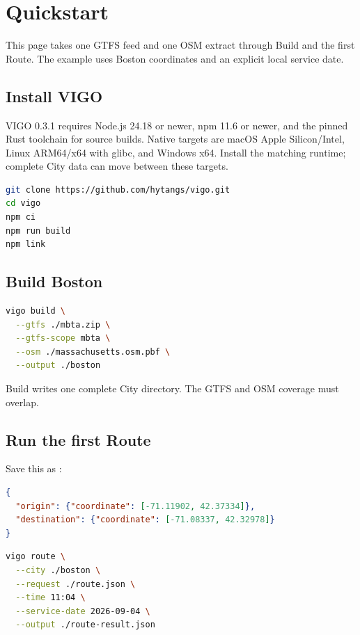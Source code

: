 \documentclass[10pt,letterpaper]{article}
\begin{document}
\guideheader

\section{Quickstart}

This page takes one GTFS feed and one OSM extract through Build and the first Route. The example uses Boston coordinates and an explicit local service date.

\subsection{Install VIGO}

VIGO 0.3.1 requires Node.js 24.18 or newer, npm 11.6 or newer, and the pinned Rust toolchain for source builds. Native targets are macOS Apple Silicon/Intel, Linux ARM64/x64 with glibc, and Windows x64. Install the matching runtime; complete City data can move between these targets.

\begin{lstlisting}[language=bash]
git clone https://github.com/hytangs/vigo.git
cd vigo
npm ci
npm run build
npm link
\end{lstlisting}

\subsection{Build Boston}

\begin{lstlisting}[language=bash]
vigo build \
  --gtfs ./mbta.zip \
  --gtfs-scope mbta \
  --osm ./massachusetts.osm.pbf \
  --output ./boston
\end{lstlisting}

Build writes one complete City directory. The GTFS and OSM coverage must overlap.

\subsection{Run the first Route}

Save this as \code{route.json}:

\begin{lstlisting}[language=json]
{
  "origin": {"coordinate": [-71.11902, 42.37334]},
  "destination": {"coordinate": [-71.08337, 42.32978]}
}
\end{lstlisting}

\begin{lstlisting}[language=bash]
vigo route \
  --city ./boston \
  --request ./route.json \
  --time 11:04 \
  --service-date 2026-09-04 \
  --output ./route-result.json
\end{lstlisting}
\end{document}
